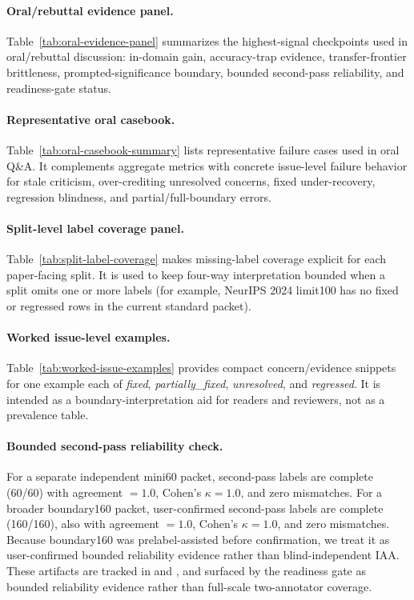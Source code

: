 \paragraph{Oral/rebuttal evidence panel.}
Table~\ref{tab:oral-evidence-panel} summarizes the highest-signal checkpoints used in oral/rebuttal discussion: in-domain gain, accuracy-trap evidence, transfer-frontier brittleness, prompted-significance boundary, bounded second-pass reliability, and readiness-gate status.


\paragraph{Representative oral casebook.}
Table~\ref{tab:oral-casebook-summary} lists representative failure cases used in oral Q\&A.
It complements aggregate metrics with concrete issue-level failure behavior for stale criticism, over-crediting unresolved concerns, fixed under-recovery, regression blindness, and partial/full-boundary errors.


\paragraph{Split-level label coverage panel.}
Table~\ref{tab:split-label-coverage} makes missing-label coverage explicit for each paper-facing split.
It is used to keep four-way interpretation bounded when a split omits one or more labels (for example, NeurIPS 2024 limit100 has no fixed or regressed rows in the current standard packet).


\paragraph{Worked issue-level examples.}
Table~\ref{tab:worked-issue-examples} provides compact concern/evidence snippets for one example each of \textit{fixed}, \textit{partially\_fixed}, \textit{unresolved}, and \textit{regressed}.
It is intended as a boundary-interpretation aid for readers and reviewers, not as a prevalence table.


\paragraph{Bounded second-pass reliability check.}
For a separate independent mini60 packet, second-pass labels are complete (60/60) with agreement $=1.0$, Cohen's $\kappa=1.0$, and zero mismatches.
For a broader boundary160 packet, user-confirmed second-pass labels are complete (160/160), also with agreement $=1.0$, Cohen's $\kappa=1.0$, and zero mismatches.
Because boundary160 was prelabel-assisted before confirmation, we treat it as user-confirmed bounded reliability evidence rather than blind-independent IAA.
These artifacts are tracked in  and , and surfaced by the readiness gate as bounded reliability evidence rather than full-scale two-annotator coverage.
